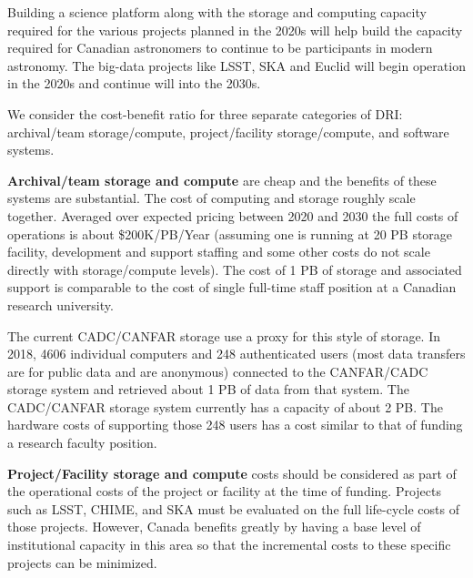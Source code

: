 \documentclass[11pt]{article}
\begin{document}
\begin{lrptextbox} 
Building a science platform along with the storage and computing capacity required for the various projects planned in the 2020s will help build the capacity required for Canadian astronomers to continue to be participants in modern astronomy.  The big-data projects like LSST, SKA and Euclid will begin operation in the 2020s and continue will into the 2030s.

\end{lrptextbox}

\begin{lrptextbox} 

We consider the cost-benefit ratio for three separate categories of DRI:  archival/team storage/compute, project/facility storage/compute, and software systems.

{\bf Archival/team storage and compute} are cheap and the benefits of these systems are substantial.  The cost of computing and storage roughly scale together.   Averaged over expected pricing between 2020 and 2030 the full costs of operations is about \$200K/PB/Year (assuming one is running at 20 PB storage facility,  development and support staffing and some other costs do not scale directly with storage/compute levels). The cost of 1 PB of storage and associated support is comparable to the cost of single full-time staff position at a Canadian research university.  

The current CADC/CANFAR storage use a proxy for this style of storage. In 2018, 4606 individual computers and 248 authenticated users (most data transfers are for public data and are anonymous) connected to the CANFAR/CADC storage system and retrieved about 1 PB of data from that system.  The CADC/CANFAR  storage system currently has a capacity of about 2 PB.  The hardware costs of supporting those 248 users has a cost similar to that of funding a research faculty position.  

{\bf Project/Facility storage and compute} costs should be considered as part of the operational costs of the project or facility at the time of funding. Projects such as LSST, CHIME, and SKA must be evaluated on the full life-cycle costs of those projects.  However, Canada benefits greatly by having a base level of institutional capacity in this area so that the incremental costs to these specific projects can be minimized.


\end{lrptextbox}
\end{document}
